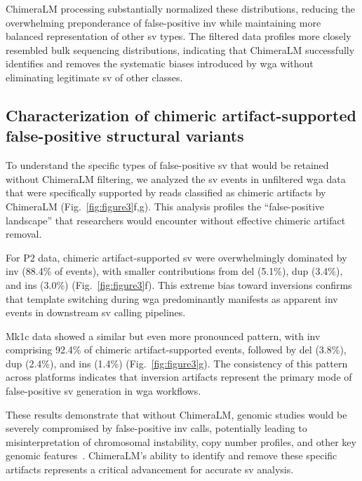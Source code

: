 \documentclass[pdflatex,sn-nature]{sn-jnl}%
\theoremstyle{thmstyleone}%
\theoremstyle{thmstyletwo}%
\theoremstyle{thmstylethree}%
\begin{document}
ChimeraLM processing substantially normalized these distributions, reducing the overwhelming preponderance of false-positive \gls{inv} while maintaining more balanced representation of other \gls{sv} types.
The filtered data profiles more closely resembled bulk sequencing distributions, indicating that ChimeraLM successfully identifies and removes the systematic biases introduced by \gls{wga} without eliminating legitimate \gls{sv} of other classes.

\subsection*{Characterization of chimeric artifact-supported false-positive structural variants}

To understand the specific types of false-positive \gls{sv} that would be retained without ChimeraLM filtering, we analyzed the \gls{sv} events in unfiltered \gls{wga} data that were specifically supported by reads classified as chimeric artifacts by ChimeraLM (Fig.~\ref{fig:figure3}f,g).
This analysis profiles the ``false-positive landscape'' that researchers would encounter without effective chimeric artifact removal.

For P2 data, chimeric artifact-supported \gls{sv} were overwhelmingly dominated by \gls{inv} (88.4\% of events), with smaller contributions from \gls{del} (5.1\%), \gls{dup} (3.4\%), and \gls{ins} (3.0\%) (Fig.~\ref{fig:figure3}f).
This extreme bias toward inversions confirms that template switching during \gls{wga} predominantly manifests as apparent \gls{inv} events in downstream \gls{sv} calling pipelines.

Mk1c data showed a similar but even more pronounced pattern, with \gls{inv} comprising 92.4\% of chimeric artifact-supported events, followed by \gls{del} (3.8\%), \gls{dup} (2.4\%), and \gls{ins} (1.4\%) (Fig.~\ref{fig:figure3}g).
The consistency of this pattern across platforms indicates that inversion artifacts represent the primary mode of false-positive \gls{sv} generation in \gls{wga} workflows.

These results demonstrate that without ChimeraLM, genomic studies would be severely compromised by false-positive \gls{inv} calls, potentially leading to misinterpretation of chromosomal instability, copy number profiles, and other key genomic features~\cite{kosugi2019comprehensive, mahmoud2019structural}.
ChimeraLM's ability to identify and remove these specific artifacts represents a critical advancement for accurate \gls{sv} analysis.
\end{document}
